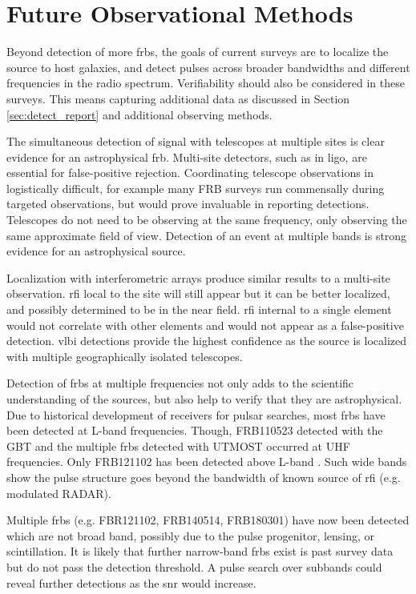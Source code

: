\documentclass[a4paper,fleqn,usenatbib]{mnras}
\begin{document}
\section{Future Observational Methods}

Beyond detection of more \glspl{frb}, the goals of current surveys are to
localize the source to host galaxies, and detect pulses across broader
bandwidths and different frequencies in the radio spectrum. Verifiability should
also be considered in these surveys. This means capturing additional data as
discussed in Section \ref{sec:detect_report} and additional observing methods.

The simultaneous detection of signal with telescopes at multiple sites is
clear evidence for an astrophysical \gls{frb}.  Multi-site detectors, such as in
\gls{ligo}, are essential for false-positive rejection. Coordinating telescope
observations in logistically difficult, for example many FRB surveys run
commensally during targeted observations, but would prove invaluable in
reporting detections. Telescopes do not need to be observing at the same
frequency, only observing the same approximate field of view. Detection of an
event at multiple bands is strong evidence for an astrophysical source.

Localization with interferometric arrays produce similar results to a multi-site
observation. \gls{rfi} local to the site will still appear but it can be better
localized, and possibly determined to be in the near field. \gls{rfi} internal
to a single element would not correlate with other elements and would not appear
as a false-positive detection.  \gls{vlbi} detections provide the highest
confidence as the source is localized with multiple geographically isolated
telescopes.

Detection of \glspl{frb} at multiple frequencies not only adds to the scientific
understanding of the sources, but also help to verify that they are
astrophysical.  Due to historical development of receivers for pulsar searches,
most \glspl{frb} have been detected at L-band frequencies. Though, FRB110523
detected with the GBT and the multiple \glspl{frb} detected with UTMOST occurred
at UHF frequencies.  Only FRB121102 has been detected above L-band
\citep{atel10675}.  Such wide bands show the pulse structure goes beyond the
bandwidth of known source of \gls{rfi} (e.g. modulated RADAR). 

Multiple \glspl{frb} (e.g. FBR121102, FRB140514, FRB180301) have now been
detected which are not broad band, possibly due to the pulse progenitor,
lensing, or scintillation. It is likely that further narrow-band \glspl{frb}
exist is past survey data but do not pass the detection threshold. A pulse
search over subbands could reveal further detections as the \gls{snr} would
increase.
\end{document}
